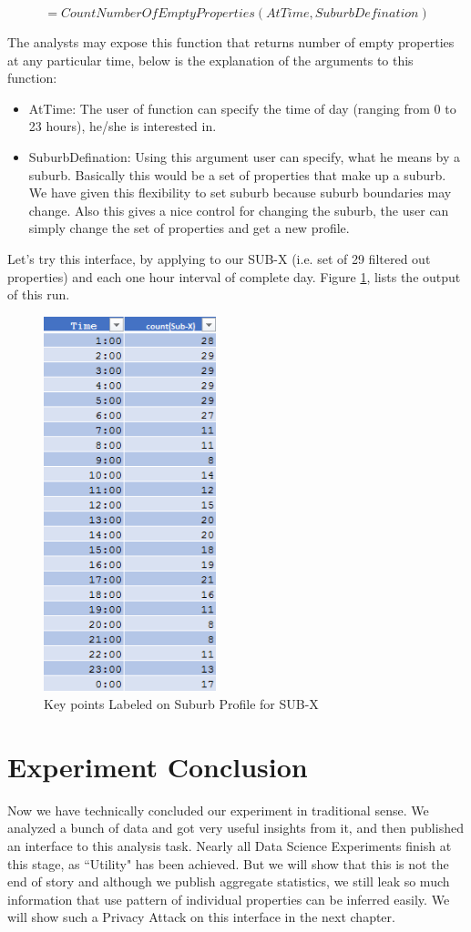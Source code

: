 \documentclass[12pt]{report}
\theoremstyle{named}
\begin{document}
\[=CountNumberOfEmptyProperties(AtTime,SuburbDefination)\]

The analysts may expose this function that returns number of empty properties at any particular time, below is the explanation of the arguments to this function:

\begin{itemize}
  \item AtTime: The user of function can specify the time of day (ranging from 0 to 23 hours), he/she is interested in.
  \item SuburbDefination: Using this argument user can specify, what he means by a suburb. Basically this would be a set of properties that make up a suburb. We have given this flexibility to set suburb because suburb boundaries may change. Also this gives a nice control for changing the suburb, the user can simply change the set of properties and get a new profile.
\end{itemize}

Let's try this interface, by applying to our SUB-X (i.e. set of 29 filtered out properties) and each one hour interval of complete day. Figure \ref{fig:InterfaceRun}, lists the output of this run.
\begin{figure}[ht]
\centering
        \includegraphics[width=50mm,scale=1]{Images/InterfaceRun.PNG}
    \caption{Key points Labeled on Suburb Profile for SUB-X}
    \label{fig:InterfaceRun}
\end{figure}

\section{Experiment Conclusion}
Now we have technically concluded our experiment in traditional sense. We analyzed a bunch of data and got very useful insights from it, and then published an interface to this analysis task. Nearly all Data Science Experiments finish at this stage, as ``Utility" has been achieved. But we will show that this is not the end of story and although we publish aggregate statistics, we still leak so much information that use pattern of individual properties can be inferred easily. We will show such a Privacy Attack on this interface in the next chapter.
\end{document}
